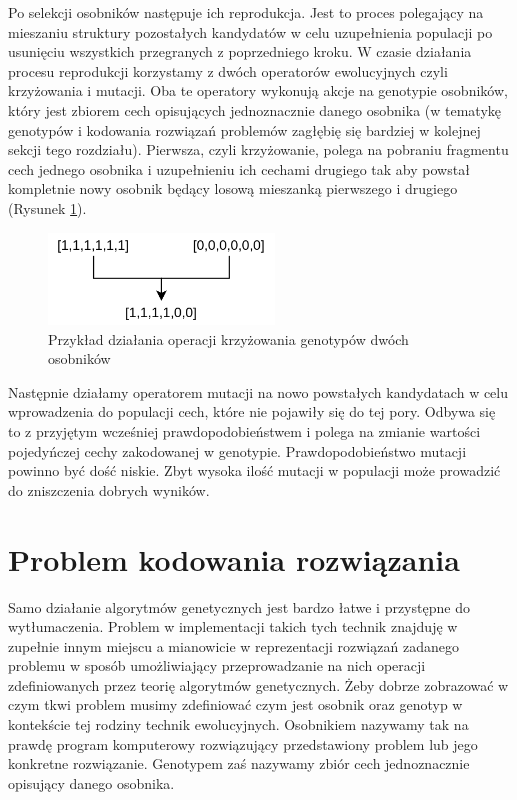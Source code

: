 \documentclass[12pt, oneside, a4paper]{report}
\begin{document}
Po selekcji osobników następuje ich reprodukcja. Jest to proces polegający na mieszaniu struktury pozostałych kandydatów w celu uzupełnienia populacji po usunięciu wszystkich przegranych z poprzedniego kroku. W czasie działania procesu reprodukcji korzystamy z dwóch operatorów ewolucyjnych czyli krzyżowania i mutacji. Oba te operatory wykonują akcje na genotypie osobników, który jest zbiorem cech opisujących jednoznacznie danego osobnika (w tematykę genotypów i kodowania rozwiązań problemów zagłębię się bardziej w kolejnej sekcji tego rozdziału). Pierwsza, czyli krzyżowanie, polega na pobraniu fragmentu cech jednego osobnika i uzupełnieniu ich cechami drugiego tak aby powstał kompletnie nowy osobnik będący losową mieszanką pierwszego i drugiego (Rysunek \ref{fig: 3.2}). 

\begin{figure}[h]
	\centering
	\includegraphics[width=6cm]{fig32.png}
	\caption{Przykład działania operacji krzyżowania genotypów dwóch osobników}
	\label{fig: 3.2}
\end{figure}

Następnie działamy operatorem mutacji na nowo powstałych kandydatach w celu wprowadzenia do populacji cech, które nie pojawiły się do tej pory. Odbywa się to z przyjętym wcześniej prawdopodobieństwem i polega na zmianie wartości pojedyńczej cechy zakodowanej w genotypie. Prawdopodobieństwo mutacji powinno być dość niskie. Zbyt wysoka ilość mutacji w populacji może prowadzić do zniszczenia dobrych wyników.

\section{Problem kodowania rozwiązania}

Samo działanie algorytmów genetycznych jest bardzo łatwe i przystępne do wytłumaczenia. Problem w implementacji takich tych technik znajduję w zupełnie innym miejscu a mianowicie w reprezentacji rozwiązań zadanego problemu w sposób umożliwiający przeprowadzanie na nich operacji zdefiniowanych przez teorię algorytmów genetycznych. Żeby dobrze zobrazować w czym tkwi problem musimy zdefiniować czym jest osobnik oraz genotyp w kontekście tej rodziny technik ewolucyjnych. Osobnikiem nazywamy tak na prawdę program komputerowy rozwiązujący przedstawiony problem lub jego konkretne rozwiązanie. Genotypem zaś nazywamy zbiór cech jednoznacznie opisujący danego osobnika. 
\end{document}
